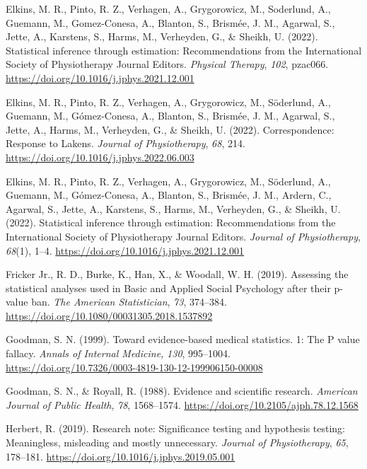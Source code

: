 \documentclass[]{cik}%
\newlength{\cslhangindent}
\newlength{\cslentryspacingunit} %
\newenvironment{CSLReferences}[2] %
 {%
  \setlength{\parindent}{0pt}
  \ifodd #1
  \let\oldpar\par
  \def\par{\hangindent=\cslhangindent\oldpar}
  \fi
  \setlength{\parskip}{#2\cslentryspacingunit}
 }%
 {}
\begin{document}
\begin{CSLReferences}{1}{0}
\leavevmode{}%
Elkins, M. R., Pinto, R. Z., Verhagen, A., Grygorowicz, M., Soderlund,
A., Guemann, M., Gomez-Conesa, A., Blanton, S., Brismée, J. M., Agarwal,
S., Jette, A., Karstens, S., Harms, M., Verheyden, G., \& Sheikh, U.
(2022). Statistical inference through estimation: Recommendations from
the International Society of Physiotherapy Journal Editors.
\emph{Physical Therapy}, \emph{102}, pzac066.
\url{https://doi.org/10.1016/j.jphys.2021.12.001}

\leavevmode{}%
Elkins, M. R., Pinto, R. Z., Verhagen, A., Grygorowicz, M., Söderlund,
A., Guemann, M., Gómez-Conesa, A., Blanton, S., Brismée, J. M., Agarwal,
S., Jette, A., Harms, M., Verheyden, G., \& Sheikh, U. (2022).
Correspondence: Response to Lakens. \emph{Journal of Physiotherapy},
\emph{68}, 214. \url{https://doi.org/10.1016/j.jphys.2022.06.003}

\leavevmode{}%
Elkins, M. R., Pinto, R. Z., Verhagen, A., Grygorowicz, M., Söderlund,
A., Guemann, M., Gómez-Conesa, A., Blanton, S., Brismée, J. M., Ardern,
C., Agarwal, S., Jette, A., Karstens, S., Harms, M., Verheyden, G., \&
Sheikh, U. (2022). Statistical inference through estimation:
Recommendations from the International Society of Physiotherapy Journal
Editors. \emph{Journal of Physiotherapy}, \emph{68}(1), 1--4.
\url{https://doi.org/10.1016/j.jphys.2021.12.001}

\leavevmode{}%
Fricker Jr., R. D., Burke, K., Han, X., \& Woodall, W. H. (2019).
Assessing the statistical analyses used in Basic and Applied Social
Psychology after their p-value ban. \emph{The American Statistician},
\emph{73}, 374--384. \url{https://doi.org/10.1080/00031305.2018.1537892}

\leavevmode{}%
Goodman, S. N. (1999). Toward evidence-based medical statistics. 1: The
P value fallacy. \emph{Annals of Internal Medicine,} \emph{130},
995--1004.
\url{https://doi.org/10.7326/0003-4819-130-12-199906150-00008}

\leavevmode{}%
Goodman, S. N., \& Royall, R. (1988). Evidence and scientific research.
\emph{American Journal of Public Health}, \emph{78}, 1568--1574.
\url{https://doi.org/10.2105/ajph.78.12.1568}

\leavevmode{}%
Herbert, R. (2019). Research note: Significance testing and hypothesis
testing: Meaningless, misleading and mostly unnecessary. \emph{Journal
of Physiotherapy}, \emph{65}, 178--181.
\url{https://doi.org/10.1016/j.jphys.2019.05.001}


\end{CSLReferences}
\end{document}

